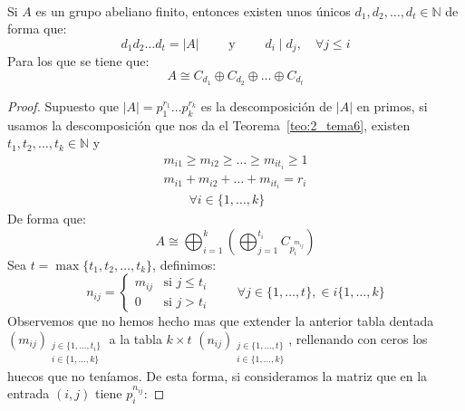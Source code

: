 \begin{teo}\label{teo:3_tema6}\ \\
    Si $A$ es un grupo abeliano finito, entonces existen unos únicos $d_1,d_2,\ldots,d_t \in \mathbb{N}$ de forma que:
    \begin{equation*}
        d_1d_2\ldots d_t = |A| \qquad \text{\ y\ } \qquad d_i \mid d_j, \quad \forall j\leq i
    \end{equation*}
    Para los que se tiene que:
    \begin{equation*}
        A\cong C_{d_1} \oplus C_{d_2} \oplus \ldots \oplus C_{d_t}
    \end{equation*}
    \begin{proof}
        Supuesto que $|A| = p_1^{r_1}\ldots p_k^{r_k}$ es la descomposición de $|A|$ en primos, si usamos la descomposición que nos da el Teorema~\ref{teo:2_tema6}, existen $t_1,t_2,\ldots,t_k \in \mathbb{N}$ y
        \begin{align*}
            m_{i1} \geq m_{i2} \geq \ldots \geq m_{it_{i}} \geq 1 \\
            m_{i1} + m_{i2} + \ldots + m_{it_{i}} = r_i \\
            \qquad \forall i \in \{1,\ldots,k\}
        \end{align*}
        De forma que:
        \begin{equation*}
            A \cong \bigoplus_{i=1}^k \left(\bigoplus_{j=1}^{t_i} C_{p_i^{m_{ij}}}\right)
        \end{equation*}
        Sea $t = \max\{t_1, t_2, \ldots, t_k\}$, definimos:
        \begin{equation*}
            n_{ij} = \left\{\begin{array}{ll}
                    m_{ij} & \text{si\ } j \leq t_i \\
                    0 & \text{si\ } j > t_i
            \end{array}\right. \qquad \forall j\in \{1,\ldots,t\}, \in i\{1,\ldots,k\}
        \end{equation*}
        Observemos que no hemos hecho mas que extender la anterior tabla dentada $(m_{ij})_{\substack{j \in \{1,\ldots,t_i\} \\ i \in \{1,\ldots,k\}}}$ a la tabla $k\times t$ $(n_{ij})_{\substack{j \in \{1,\ldots,t\} \\ i \in \{1,\ldots,k\}}}$, rellenando con ceros los huecos que no teníamos. De esta forma, si consideramos la matriz que en la entrada $(i,j)$ tiene $p_i^{n_{ij}}$:

\end{proof}
\end{teo}
